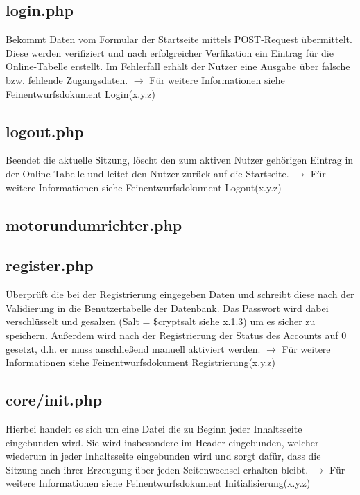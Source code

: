 \documentclass[fontsize = 12pt, paper = a4]{scrreprt}
\begin{document}
\subsection{login.php}
Bekommt Daten vom Formular der Startseite mittels POST-Request übermittelt. Diese werden verifiziert und nach erfolgreicher Verfikation ein Eintrag für die Online-Tabelle erstellt. Im Fehlerfall erhält der Nutzer eine Ausgabe über falsche bzw. fehlende Zugangsdaten. $\rightarrow$ Für weitere Informationen siehe Feinentwurfsdokument \glqq Login\grqq(x.y.z)

\subsection{logout.php}
Beendet die aktuelle Sitzung, löscht den zum aktiven Nutzer gehörigen Eintrag in der Online-Tabelle und leitet den Nutzer zurück auf die Startseite.
$\rightarrow$ Für weitere Informationen siehe Feinentwurfsdokument \glqq Logout\grqq (x.y.z)

\subsection{motorundumrichter.php}

\subsection{register.php}
Überprüft die bei der Registrierung eingegeben Daten und schreibt diese nach der Validierung in die Benutzertabelle der Datenbank. Das Passwort wird dabei verschlüsselt und gesalzen (Salt = \$cryptsalt siehe x.1.3) um es sicher zu speichern. Außerdem wird nach der Registrierung der Status des Accounts auf 0 gesetzt, d.h. er muss anschließend manuell aktiviert werden.
$\rightarrow$ Für weitere Informationen siehe Feinentwurfsdokument \glqq Registrierung\grqq (x.y.z)

\subsection{core/init.php}
Hierbei handelt es sich um eine Datei die zu Beginn jeder Inhaltsseite eingebunden wird. Sie wird insbesondere im Header eingebunden, welcher wiederum in jeder Inhaltsseite eingebunden wird und sorgt dafür, dass die Sitzung nach ihrer Erzeugung über jeden Seitenwechsel erhalten bleibt.
$\rightarrow$ Für weitere Informationen siehe Feinentwurfsdokument \glqq Initialisierung\grqq (x.y.z)
\end{document}
